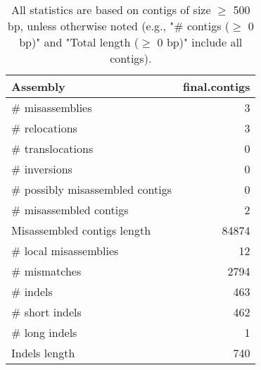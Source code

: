 \documentclass[12pt,a4paper]{article}
\begin{document}
\begin{table}[ht]
\begin{center}
\caption{All statistics are based on contigs of size $\geq$ 500 bp, unless otherwise noted (e.g., "\# contigs ($\geq$ 0 bp)" and "Total length ($\geq$ 0 bp)" include all contigs).}
\begin{tabular}{|l*{1}{|r}|}
\hline
Assembly & final.contigs \\ \hline
\# misassemblies & 3 \\ \hline
\hspace{5mm}\# relocations & 3 \\ \hline
\hspace{5mm}\# translocations & 0 \\ \hline
\hspace{5mm}\# inversions & 0 \\ \hline
\# possibly misassembled contigs & 0 \\ \hline
\# misassembled contigs & 2 \\ \hline
Misassembled contigs length & 84874 \\ \hline
\# local misassemblies & 12 \\ \hline
\# mismatches & 2794 \\ \hline
\# indels & 463 \\ \hline
\hspace{5mm}\# short indels & 462 \\ \hline
\hspace{5mm}\# long indels & 1 \\ \hline
Indels length & 740 \\ \hline
\end{tabular}
\end{center}
\end{table}
\end{document}

